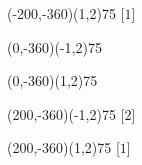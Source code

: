 \documentclass[12pt]{article}
\begin{document}
\begin{figure}[htb]
\begin{egame}
\renewcommand{\egarrowstyle}{}

\putbranch(-200,-360)(1,2){75}
[$1$]





\renewcommand{\egarrowstyle}{}

\putbranch(0,-360)(-1,2){75}

\renewcommand{\egarrowstyle}{}

\putbranch(0,-360)(1,2){75}




\renewcommand{\egarrowstyle}{}

\putbranch(200,-360)(-1,2){75}
[$2$]

\renewcommand{\egarrowstyle}{}

\putbranch(200,-360)(1,2){75}
[$1$]





\renewcommand{\egarrowstyle}{}


\end{egame}
\end{figure}
\end{document}
